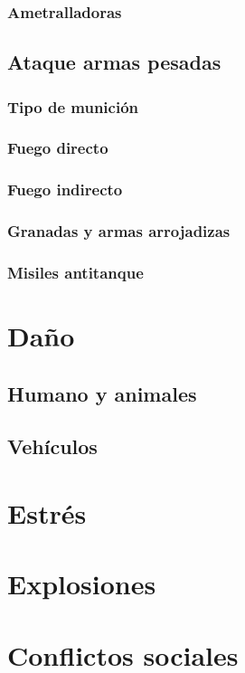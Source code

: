         \subsubsection{Ametralladoras}

    \subsection{Ataque armas pesadas}

        \subsubsection{Tipo de munición}

        \subsubsection{Fuego directo}

        \subsubsection{Fuego indirecto}

        \subsubsection{Granadas y armas arrojadizas}

        \subsubsection{Misiles antitanque}

\section{Daño}

\subsection{Humano y animales}

\subsection{Vehículos}

\section{Estrés}

\section{Explosiones}

\section{Conflictos sociales}

